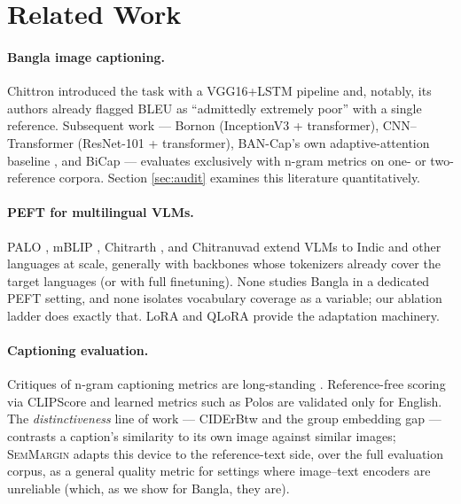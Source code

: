 \documentclass[11pt]{article}
\newcommand{\semmargin}{\textsc{SemMargin}}
\begin{document}
\section{Related Work}

\paragraph{Bangla image captioning.} Chittron \cite{chittron2019}
introduced the task with a VGG16+LSTM pipeline and, notably, its
authors already flagged BLEU as ``admittedly extremely poor'' with a
single reference. Subsequent work --- Bornon \cite{bornon2021}
(InceptionV3 + transformer), CNN--Transformer \cite{palash2021}
(ResNet-101 + transformer), BAN-Cap's own adaptive-attention baseline
\cite{bancap2022}, and BiCap \cite{bicap2025} --- evaluates exclusively
with n-gram metrics on one- or two-reference corpora. Section
\ref{sec:audit} examines this literature quantitatively.

\paragraph{PEFT for multilingual VLMs.} PALO \cite{palo2024}, mBLIP
\cite{mblip2023}, Chitrarth \cite{chitrarth2025}, and Chitranuvad
\cite{chitranuvad2025} extend VLMs to Indic and other languages at
scale, generally with backbones whose tokenizers already cover the
target languages (or with full finetuning). None studies Bangla in a
dedicated PEFT setting, and none isolates vocabulary coverage as a
variable; our ablation ladder does exactly that. LoRA
\cite{lora2021} and QLoRA \cite{qlora2023} provide the adaptation
machinery.

\paragraph{Captioning evaluation.} Critiques of n-gram captioning
metrics are long-standing \cite{kilickaya2017}. Reference-free scoring
via CLIPScore \cite{clipscore2021} and learned metrics such as Polos
\cite{polos2024} are validated only for English. The
\emph{distinctiveness} line of work --- CIDErBtw \cite{ciderbtw2020}
and the group embedding gap \cite{geg2022} --- contrasts a caption's
similarity to its own image against similar images; \semmargin{}
adapts this device to the reference-text side, over the full
evaluation corpus, as a general quality metric for settings where
image--text encoders are unreliable (which, as we show for Bangla,
they are).
\end{document}
